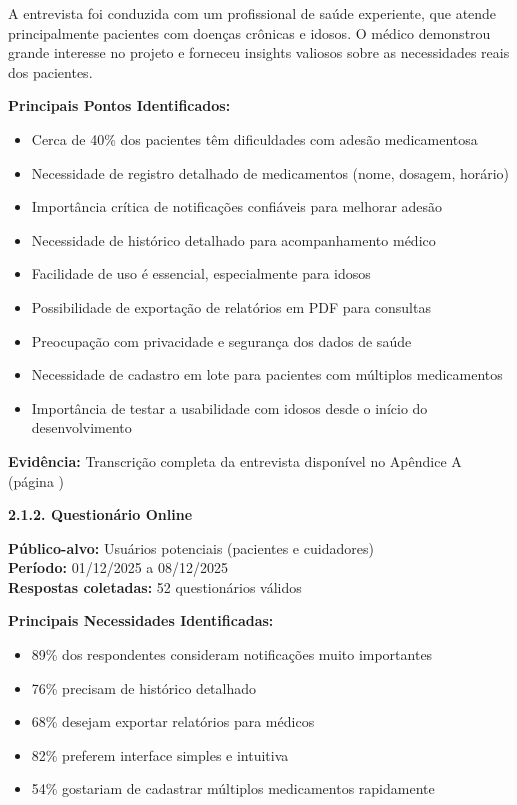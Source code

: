 \documentclass[12pt]{article}
\begin{document}
A entrevista foi conduzida com um profissional de saúde experiente, que atende principalmente pacientes com doenças crônicas e idosos. O médico demonstrou grande interesse no projeto e forneceu insights valiosos sobre as necessidades reais dos pacientes.

\textbf{Principais Pontos Identificados:}
\begin{itemize}
    \item Cerca de 40\% dos pacientes têm dificuldades com adesão medicamentosa
    \item Necessidade de registro detalhado de medicamentos (nome, dosagem, horário)
    \item Importância crítica de notificações confiáveis para melhorar adesão
    \item Necessidade de histórico detalhado para acompanhamento médico
    \item Facilidade de uso é essencial, especialmente para idosos
    \item Possibilidade de exportação de relatórios em PDF para consultas
    \item Preocupação com privacidade e segurança dos dados de saúde
    \item Necessidade de cadastro em lote para pacientes com múltiplos medicamentos
    \item Importância de testar a usabilidade com idosos desde o início do desenvolvimento
\end{itemize}

\textbf{Evidência:} Transcrição completa da entrevista disponível no Apêndice A (página \pageref{apendice-a})

\textbf{2.1.2. Questionário Online}

\textbf{Público-alvo:} Usuários potenciais (pacientes e cuidadores) \\
\textbf{Período:} 01/12/2025 a 08/12/2025 \\
\textbf{Respostas coletadas:} 52 questionários válidos

\textbf{Principais Necessidades Identificadas:}
\begin{itemize}
    \item 89\% dos respondentes consideram notificações muito importantes
    \item 76\% precisam de histórico detalhado
    \item 68\% desejam exportar relatórios para médicos
    \item 82\% preferem interface simples e intuitiva
    \item 54\% gostariam de cadastrar múltiplos medicamentos rapidamente
\end{itemize}
\end{document}
